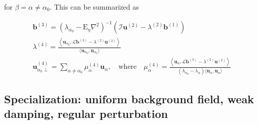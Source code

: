 %
for $\beta = \alpha \neq \alpha_0$. This can be summarized as
%
\begin{mdframed}[style=HighlightBox, frametitle={General formulae for second-order perturbations}]
    \begin{gather*}
        \mathbf{b}^{(3)} = \left(\lambda_{\alpha_0} - \mathrm{E}_\eta \nabla^2\right)^{-1} \left(\mathcal{I} \mathbf{u}^{(2)} - \lambda^{(2)} \mathbf{b}^{(1)}\right)
        \\
        \lambda^{(4)} = \frac{\left\langle \mathbf{u}_{\alpha_0}, \mathcal{L} \mathbf{b}^{(3)} - \lambda^{(2)} \mathbf{u}^{(2)} \right\rangle}{\langle \mathbf{u}_{\alpha_0}, \mathbf{u}_{\alpha_0} \rangle}
        \\
        \mathbf{u}^{(4)}_{\alpha_0 \perp} = \sum_{\alpha \neq \alpha_0} \mu_\alpha^{(4)} \mathbf{u}_{\alpha},\quad \text{where} \quad 
        \mu_\alpha^{(4)} = \frac{\left\langle \mathbf{u}_{\alpha}, \mathcal{L} \mathbf{b}^{(3)} - \lambda^{(2)} \mathbf{u}^{(2)} \right\rangle}{(\lambda_{\alpha_0} - \lambda_\alpha) \langle \mathbf{u}_{\alpha}, \mathbf{u}_{\alpha} \rangle}
    \end{gather*}
\end{mdframed}

\subsection{Specialization: uniform background field, weak damping, regular perturbation}

